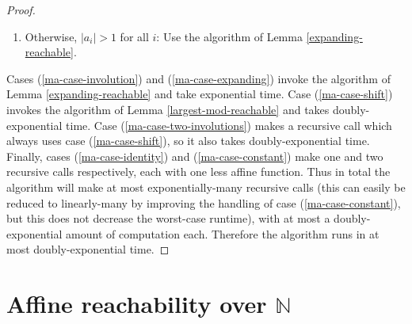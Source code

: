 \documentclass[11pt]{amsart}
\newcommand{\N}{\mathbb{N}}
\theoremstyle{definition}
\theoremstyle{remark}
\begin{document}
\begin{proof}
\begin{enumerate}
\item Otherwise, $|a_i| > 1$ for all $i$: Use the algorithm of Lemma \ref{expanding-reachable}. \label{ma-case-expanding}
\end{enumerate}
Cases (\ref{ma-case-involution}) and (\ref{ma-case-expanding}) invoke the algorithm of Lemma \ref{expanding-reachable} and take exponential time. Case (\ref{ma-case-shift}) invokes the algorithm of Lemma \ref{largest-mod-reachable} and takes doubly-exponential time. Case (\ref{ma-case-two-involutions}) makes a recursive call which always uses case (\ref{ma-case-shift}), so it also takes doubly-exponential time. Finally, cases (\ref{ma-case-identity}) and (\ref{ma-case-constant}) make one and two recursive calls respectively, each with one less affine function. Thus in total the algorithm will make at most exponentially-many recursive calls (this can easily be reduced to linearly-many by improving the handling of case (\ref{ma-case-constant}), but this does not decrease the worst-case runtime), with at most a doubly-exponential amount of computation each. Therefore the algorithm runs in at most doubly-exponential time.
\end{proof}

\section{Affine reachability over $\N$} \label{reach-n}
\end{document}
